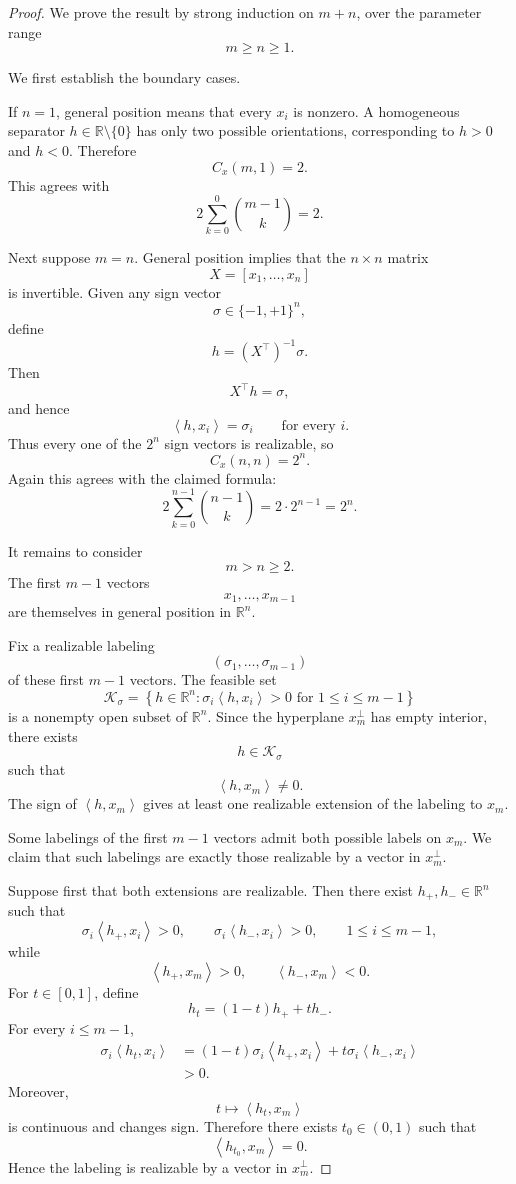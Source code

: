 \documentclass[11pt]{article}
\newcommand{\R}{\mathbb{R}}
\newcommand{\ip}[2]{\left\langle #1,#2\right\rangle}
\newcommand{\1}{\mathbf{1}}
\begin{document}
\begin{proof}
We prove the result by strong induction on \(m+n\), over the parameter
range
\[
m\ge n\ge1.
\]

We first establish the boundary cases.

If \(n=1\), general position means that every \(x_i\) is nonzero.
A homogeneous separator \(h\in\R\setminus\{0\}\) has only two possible
orientations, corresponding to \(h>0\) and \(h<0\). Therefore
\[
C_x(m,1)=2.
\]
This agrees with
\[
2\sum_{k=0}^{0}\binom{m-1}{k}=2.
\]

Next suppose \(m=n\). General position implies that the \(n\times n\)
matrix
\[
X=[x_1,\dots,x_n]
\]
is invertible. Given any sign vector
\[
\sigma\in\{-1,+1\}^n,
\]
define
\[
h=(X^\top)^{-1}\sigma.
\]
Then
\[
X^\top h=\sigma,
\]
and hence
\[
\ip{h}{x_i}=\sigma_i
\qquad
\text{for every }i.
\]
Thus every one of the \(2^n\) sign vectors is realizable, so
\[
C_x(n,n)=2^n.
\]
Again this agrees with the claimed formula:
\[
2\sum_{k=0}^{n-1}\binom{n-1}{k}
=
2\cdot 2^{n-1}
=
2^n.
\]

It remains to consider
\[
m>n\ge2.
\]
The first \(m-1\) vectors
\[
x_1,\dots,x_{m-1}
\]
are themselves in general position in \(\R^n\).

Fix a realizable labeling
\[
(\sigma_1,\dots,\sigma_{m-1})
\]
of these first \(m-1\) vectors. The feasible set
\[
\mathcal K_\sigma
=
\left\{
h\in\R^n:
\sigma_i\ip{h}{x_i}>0
\text{ for }1\le i\le m-1
\right\}
\]
is a nonempty open subset of \(\R^n\). Since the hyperplane
\(x_m^\perp\) has empty interior, there exists
\[
h\in\mathcal K_\sigma
\]
such that
\[
\ip{h}{x_m}\neq0.
\]
The sign of \(\ip{h}{x_m}\) gives at least one realizable extension of
the labeling to \(x_m\).

Some labelings of the first \(m-1\) vectors admit both possible labels
on \(x_m\). We claim that such labelings are exactly those realizable by
a vector in \(x_m^\perp\).

Suppose first that both extensions are realizable. Then there exist
\(h_+,h_-\in\R^n\) such that
\[
\sigma_i\ip{h_+}{x_i}>0,
\qquad
\sigma_i\ip{h_-}{x_i}>0,
\qquad
1\le i\le m-1,
\]
while
\[
\ip{h_+}{x_m}>0,
\qquad
\ip{h_-}{x_m}<0.
\]
For \(t\in[0,1]\), define
\[
h_t=(1-t)h_++th_-.
\]
For every \(i\le m-1\),
\begin{align*}
\sigma_i\ip{h_t}{x_i}
&=
(1-t)\sigma_i\ip{h_+}{x_i}
+
t\sigma_i\ip{h_-}{x_i}
\\
&>0.
\end{align*}
Moreover,
\[
t\longmapsto\ip{h_t}{x_m}
\]
is continuous and changes sign. Therefore there exists
\(t_0\in(0,1)\) such that
\[
\ip{h_{t_0}}{x_m}=0.
\]
Hence the labeling is realizable by a vector in \(x_m^\perp\).


\end{proof}
\end{document}
